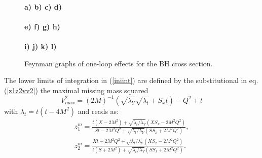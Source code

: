 \documentclass[aps,prd,reprint,groupedaddress,preprintnumbers,showpacs]{revtex4-1}
\begin{document}
\begin{figure}[t]
\centering
{}
\hspace{0.25cm}
\hspace{0.25cm}
\hspace{0.25cm}
\\[-0.1cm]
{\bf \small a) \hspace{1.52cm} b) \hspace{1.52cm} c)\hspace{1.52cm} d)}
\\[0.1cm]
\hspace{0.25cm}
\hspace{0.25cm}
\hspace{0.25cm}
\\[-0.1cm]
{\bf \small e) \hspace{1.52cm} f) \hspace{1.52cm} g)\hspace{1.52cm} h)}
\\[0.1cm]
\hspace{0.25cm}
\hspace{0.25cm}
\hspace{0.25cm}
\\[-0.1cm]
{\bf \small i) \hspace{1.52cm} j) \hspace{1.52cm} k)\hspace{1.52cm} l)}
\caption{\label{VVgraphs}Feynman graphs of one-loop effects for the BH cross section.}
 \end{figure}

 The lower limits of integration in (\ref{iniint})
 are defined by the substitutional in 
eq. (\ref{z1z2vv2}) the maximal missing mass squared 
\begin{equation}
V_{max}^2=(2M)^{-1}(\sqrt{\lambda_Y}\sqrt{\lambda_t}+S_xt)-Q^2+t
\end{equation} 
with $\lambda_t=t(t-4M^2)$ and reads as:
\begin{eqnarray}
z_1^m=\frac{t(X-2M^2)+\sqrt{\lambda_t/\lambda_Y}(XS_x-2M^2Q^2)}{St-2M^2Q^2+\sqrt{\lambda_t/\lambda_Y}(SS_x+2M^2Q^2)},
\nonumber\\
z_2^m=\frac{Xt-2M^2Q^2+\sqrt{\lambda_t/\lambda_Y}(XS_x-2M^2Q^2)}{t(S+2M^2)+\sqrt{\lambda_t/\lambda_Y}(SS_x+2M^2Q^2)}.
\label{z12m}
\end{eqnarray} 
\end{document}
